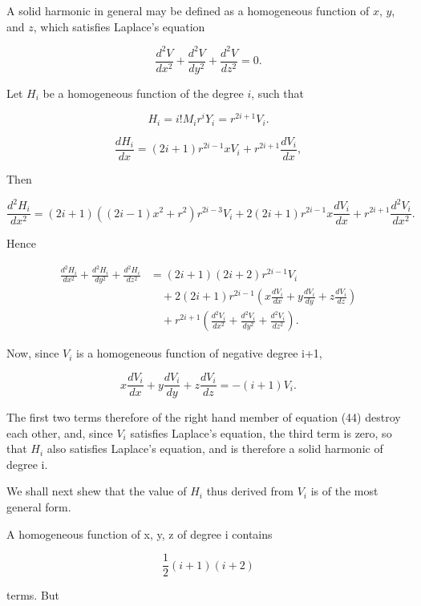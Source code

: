 \documentclass[11pt,a4paper]{article}
\begin{document}
A solid harmonic in general may be defined as a homogeneous function of $x$, $y$, and $z$, which satisfies Laplace's equation

\[
\frac{d^2V}{dx^2} + \frac{d^2V}{dy^2} + \frac{d^2V}{dz^2} = 0.
\]

Let $H_i$ be a homogeneous function of the degree $i$, such that

\begin{equation}\tag{43}
H_i=i!M_ir^iY_i=r^{2i+1}V_i.
\end{equation}

\[
\frac{dH_{i}}{dx} = (2i+1) r^{2i-1} x V_{i} + r^{2i+1} \frac{dV_{i}}{dx},
\]

Then

\[
\frac{d^2 H_i}{dx^2} = (2i+1)((2i-1)x^2 + r^2)r^{2i-3}V_i + 2(2i+1)r^{2i-1}x\frac{dV_i}{dx} + r^{2i+1}\frac{d^2V_i}{dx^2}.
\]

Hence

\begin{equation}\tag{44}
\begin{split}
\frac{d^{2}H_{i}}{dx^{2}} + \frac{d^{2}H_{i}}{dy^{2}} + \frac{d^{2}H_{i}}{dz^{2}}
&= (2i+1)(2i+2)r^{2i-1}V_{i}\\
&\quad+2(2i+1)r^{2i-1}\left(x\frac{dV_{i}}{dx}+y\frac{dV_{i}}{dy}+z\frac{dV_{i}}{dz}\right)\\
&\quad+r^{2i+1}\left(\frac{d^{2}V_{i}}{dx^{2}}+\frac{d^{2}V_{i}}{dy^{2}}+\frac{d^{2}V_{i}}{dz^{2}}\right).
\end{split}
\end{equation}

Now, since  $V_i$  is a homogeneous function of negative degree i+1,

\begin{equation}\tag{45}
x\frac{dV_i}{dx}+y\frac{dV_i}{dy}+z\frac{dV_i}{dz}=-(i+1)V_i.
\end{equation}

The first two terms therefore of the right hand member of equation (44) destroy each other, and, since  $V_i$  satisfies Laplace's equation, the third term is zero, so that  $H_i$  also satisfies Laplace's equation, and is therefore a solid harmonic of degree i.

We shall next shew that the value of  $H_i$  thus derived from  $V_i$  is of the most general form.

A homogeneous function of x, y, z of degree i contains

\[
\frac{1}{2}(i+1)(i+2)
\]

terms. But
\end{document}
